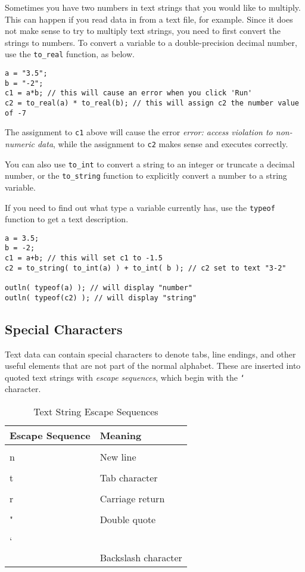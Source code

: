 \documentclass{article}
\newcommand\bslash{\char`\\}
\begin{document}
Sometimes you have two numbers in text strings that you would like to multiply.  This can happen if you read data in from a text file, for example.  Since it does not make sense to try to multiply text strings, you need to first convert the strings to numbers.  To convert a variable to a double-precision decimal number, use the \texttt{to\_real} function, as below.

\begin{verbatim}
a = "3.5";
b = "-2";
c1 = a*b; // this will cause an error when you click 'Run'
c2 = to_real(a) * to_real(b); // this will assign c2 the number value of -7
\end{verbatim}

The assignment to \texttt{c1} above will cause the error \emph{error: access violation to non-numeric data}, while the assignment to \texttt{c2} makes sense and executes correctly.

You can also use \texttt{to\_int} to convert a string to an integer or truncate a decimal number, or the \texttt{to\_string} function to explicitly convert a number to a string variable.  

If you need to find out what type a variable currently has, use the \texttt{typeof} function to get a text description.

\begin{verbatim}
a = 3.5;
b = -2;
c1 = a+b; // this will set c1 to -1.5
c2 = to_string( to_int(a) ) + to_int( b ); // c2 set to text "3-2"

outln( typeof(a) ); // will display "number"
outln( typeof(c2) ); // will display "string"
\end{verbatim}

\subsection{Special Characters}

Text data can contain special characters to denote tabs, line endings, and other useful elements that are not part of the normal alphabet.  These are inserted into quoted text strings with \emph{escape sequences}, which begin with the \texttt{\bslash} character.

\begin{table}[ht]
\begin{center}
\begin{tabular}{ll}
Escape Sequence & Meaning\\
\hline
\texttt{\bslash n} & New line\\
\texttt{\bslash t} & Tab character\\
\texttt{\bslash r} & Carriage return\\
\texttt{\bslash "} & Double quote\\
\texttt{\bslash\bslash} & Backslash character\\
\end{tabular}
\caption{Text String Escape Sequences}
\label{tab_escseq}
\end{center}
\end{table}
\end{document}
